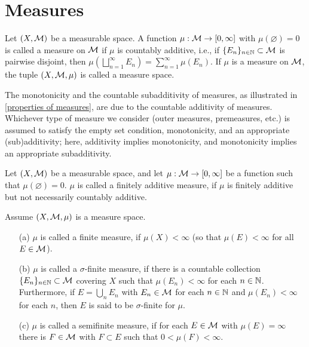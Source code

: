 \section{Measures}

\begin{defi}[Measure]
    Let $(X, {\mathcal{M}})$ be a measurable space.
    A function $\mu: {\mathcal{M}}\rightarrow[0, \infty]$ with $\mu(\varnothing)=0$ is called a measure on ${\mathcal{M}}$ if $\mu$ is countably additive, i.e., if $\{E_n\}_{n\in{\mathbb{N}}}\subset{\mathcal{M}}$ is pairwise disjoint, then $\mu\left(\bigsqcup_{n=1}^\infty E_n\right)=\sum_{n=1}^\infty \mu(E_n)$.
    If $\mu$ is a measure on ${\mathcal{M}}$, the tuple $(X, {\mathcal{M}}, \mu)$ is called a measure space.
\end{defi}
\begin{rmk}
    The monotonicity and the countable subadditivity of measures, as illustrated in \cref{properties of measures}, are due to the countable additivity of measures.
    Whichever type of measure we consider (outer measures, premeasures, etc.) is assumed to satisfy the empty set condition, monotonicity, and an appropriate (sub)additivity; here, additivity implies monotonicity, and monotonicity implies an appropriate subadditivity.
\end{rmk}
\begin{defi}
    Let $(X, {\mathcal{M}})$ be a measurable space, and let $\mu: {\mathcal{M}}\rightarrow[0, \infty]$ be a function such that $\mu(\varnothing)=0$.
    $\mu$ is called a finitely additive measure, if $\mu$ is finitely additive but not necessarily countably additive.
    
    Assume $(X, {\mathcal{M}}, \mu)$ is a measure space.
    \begin{enumerate}
        \item[(a)]
        {
            $\mu$ is called a finite measure, if $\mu(X)<\infty$ (so that $\mu(E)<\infty$ for all $E\in{\mathcal{M}}$).
        }
        \item[(b)]
        {
            $\mu$ is called a $\sigma$-finite measure, if there is a countable collection $\{E_n\}_{n\in{\mathbb{N}}}\subset{\mathcal{M}}$ covering $X$ such that $\mu(E_n)<\infty$ for each $n\in{\mathbb{N}}$.
            Furthermore, if $E=\bigcup_n E_n$ with $E_n\in{\mathcal{M}}$ for each $n\in{\mathbb{N}}$ and $\mu(E_n)<\infty$ for each $n$, then $E$ is said to be $\sigma$-finite for $\mu$.
        }
        \item[(c)]{
            $\mu$ is called a semifinite measure, if for each $E\in{\mathcal{M}}$ with $\mu(E)=\infty$ there is $F\in{\mathcal{M}}$ with $F\subset E$ such that $0<\mu(F)<\infty$.
        }
    \end{enumerate}
\end{defi}

